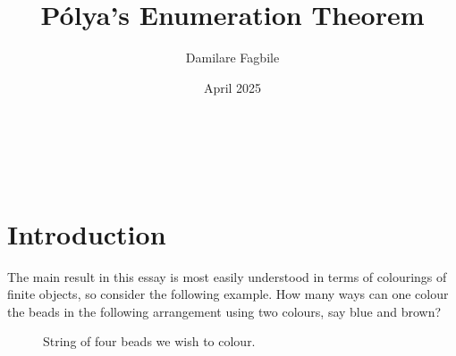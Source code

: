 \documentclass[a4paper,11pt]{article}
\title{Pólya's Enumeration Theorem}
\date{April 2025}
\author{Damilare Fagbile}
\makeatletter
\numberwithin{equation}{section}
\renewcommand{\maketitle}{%
    \begin{center}
        {\LARGE  \@title} \\[2ex]  
        {\large \@author} \\[1ex]
        {\large \@date}
    \end{center}
}
\makeatother
\begin{document}
    \nocite{*}
    
    \maketitle

    \section{Introduction}
    \label{sec: intro}

    The main result in this essay is most easily understood in terms of colourings of finite objects, so consider the following example. How many ways can one colour the beads in the following arrangement using two colours, say blue and brown? 
    
    \begin{figure}[H]
    \centering
        \caption{String of four beads we wish to colour.}
        \label{fig: 1}
    \end{figure}
\end{document}
